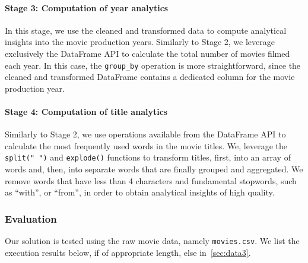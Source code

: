 \documentclass[acmlarge]{acmart}
\begin{document}
  \paragraph{Stage 3: Computation of year analytics} In this stage, we use the cleaned and transformed data to compute analytical insights into the movie production years. Similarly to Stage 2, we leverage exclusively the DataFrame API to calculate the total number of movies filmed each year. In this case, the \texttt{group\_by} operation is more straightforward, since the cleaned and transformed DataFrame contains a dedicated column for the movie production year.

  \paragraph{Stage 4: Computation of title analytics} Similarly to Stage 2, we use operations available from the DataFrame API to calculate the most frequently used words in the movie titles. We, leverage the \texttt{split(" ")} and \texttt{explode()} functions to transform titles, first, into an array of words and, then, into separate words that are finally grouped and aggregated. We remove words that have less than 4 characters and fundamental stopwords, such as ``with'', or ``from'', in order to obtain analytical insights of high quality.

  \subsubsection{Evaluation} Our solution is tested using the raw movie data, namely \texttt{movies.csv}. We list the execution results below, if of appropriate length, else in~\autoref{sec:data3}.
\end{document}
